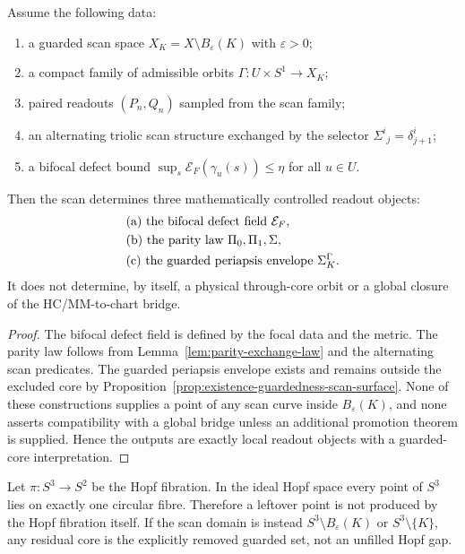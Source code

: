 \begin{theorem}
\label{thm:strict-alternating-triolic-orbit-scan}
Assume the following data:
\begin{enumerate}[label=\textup{(\roman*)}]
\item a guarded scan space $X_K=X\setminus B_\varepsilon(K)$ with $\varepsilon>0$;
\item a compact family of admissible orbits $\Gamma:U\times S^1\to X_K$;
\item paired readouts $(P_n,Q_n)$ sampled from the scan family;
\item an alternating triolic scan structure exchanged by the selector $\Sigma^i{}_j=\delta^i_{j+1}$;
\item a bifocal defect bound $\sup_s\mathcal E_F(\gamma_u(s))\leq\eta$ for all $u\in U$.
\end{enumerate}
Then the scan determines three mathematically controlled readout objects:
\[
\begin{aligned}
&\textup{(a) the bifocal defect field }\mathcal E_F,\\
&\textup{(b) the parity law }\Pi_0,\Pi_1,\Sigma,\\
&\textup{(c) the guarded periapsis envelope }\Sigma_K^\Gamma.
\end{aligned}
\]
It does not determine, by itself, a physical through-core orbit or a global closure of the HC/MM-to-chart bridge.
\end{theorem}

\begin{proof}
The bifocal defect field is defined by the focal data and the metric.  The parity law follows from Lemma~\ref{lem:parity-exchange-law} and the alternating scan predicates.  The guarded periapsis envelope exists and remains outside the excluded core by Proposition~\ref{prop:existence-guardedness-scan-surface}.  None of these constructions supplies a point of any scan curve inside $B_\varepsilon(K)$, and none asserts compatibility with a global bridge unless an additional promotion theorem is supplied.  Hence the outputs are exactly local readout objects with a guarded-core interpretation.
\end{proof}

\begin{proposition}
\label{prop:hopf-comparison-without-hidden-gap}
Let $\pi:S^3\to S^2$ be the Hopf fibration.  In the ideal Hopf space every point of $S^3$ lies on exactly one circular fibre.  Therefore a leftover point is not produced by the Hopf fibration itself.  If the scan domain is instead $S^3\setminus B_\varepsilon(K)$ or $S^3\setminus\{K\}$, any residual core is the explicitly removed guarded set, not an unfilled Hopf gap.
\end{proposition}

